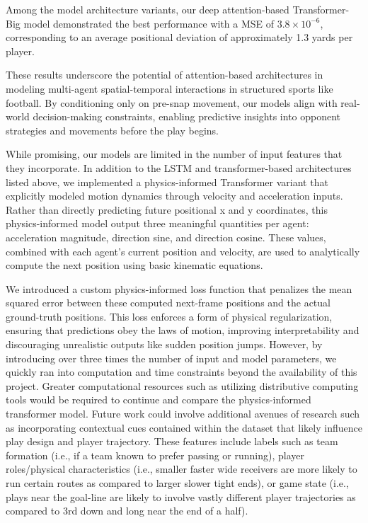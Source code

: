 \documentclass[sigconf]{acmart}
\begin{document}
 Among the model architecture variants, our deep attention-based Transformer-Big model demonstrated the best performance with a MSE of $3.8\times 10^{-6} $, corresponding to an average positional deviation of approximately 1.3 yards per player.

These results underscore the potential of attention-based architectures in modeling multi-agent spatial-temporal interactions in structured sports like football. By conditioning only on pre-snap movement, our models align with real-world decision-making constraints, enabling predictive insights into opponent strategies and movements before the play begins.

While promising, our models are limited in the number of input features that they incorporate. In addition to the LSTM and transformer-based architectures listed above, we implemented a physics-informed Transformer variant that explicitly modeled motion dynamics through velocity and acceleration inputs. Rather than directly predicting future positional x and y coordinates, this physics-informed model output three meaningful quantities per agent: acceleration magnitude, direction sine, and direction cosine. These values, combined with each agent’s current position and velocity, are used to analytically compute the next position using basic kinematic equations.

We introduced a custom physics-informed loss function that penalizes the mean squared error between these computed next-frame positions and the actual ground-truth positions. This loss enforces a form of physical regularization, ensuring that predictions obey the laws of motion, improving interpretability and discouraging unrealistic outputs like sudden position jumps. However, by introducing over three times the number of input and model parameters, we quickly ran into computation and time constraints beyond the availability of this project. Greater computational resources such as utilizing distributive computing tools would be required to continue and compare the physics-informed transformer model. Future work could involve additional avenues of research such as incorporating contextual cues contained within the dataset that likely influence play design and player trajectory. These features include labels such as team formation (i.e., if a team known to prefer passing or running), player roles/physical characteristics (i.e., smaller faster wide receivers are more likely to run certain routes as compared to larger slower tight ends), or game state (i.e., plays near the goal-line are likely to involve vastly different player trajectories as compared to 3rd down and long near the end of a half). 
\end{document}
